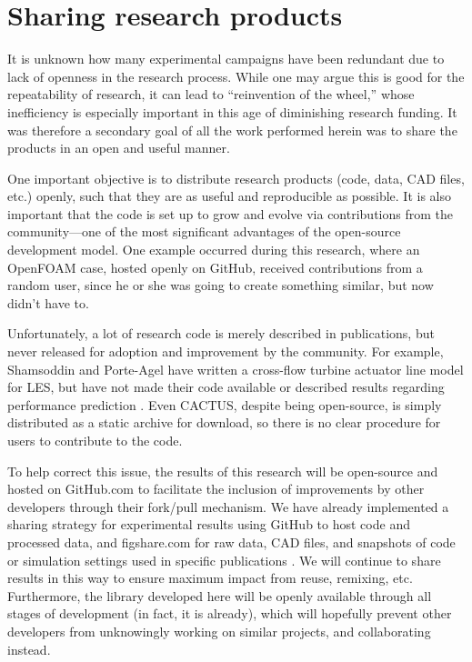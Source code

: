 \chapter{Sharing research products}
\doublespace

It is unknown how many experimental campaigns have been redundant due to lack of
openness in the research process. While one may argue this is good for the
repeatability of research, it can lead to ``reinvention of the wheel,'' whose
inefficiency is especially important in this age of diminishing research
funding. It was therefore a secondary goal of all the work performed herein was
to share the products in an open and useful manner.

One important objective is to distribute research products (code, data, CAD
files, etc.) openly, such that they are as useful and reproducible as possible.
It is also important that the code is set up to grow and evolve via
contributions from the community---one of the most significant advantages of the
open-source development model. One example occurred during this research, where
an OpenFOAM case, hosted openly on GitHub, received contributions from a random
user, since he or she was going to create something similar, but now didn't have
to.

Unfortunately, a lot of research code is merely described in publications, but
never released for adoption and improvement by the community. For example,
Shamsoddin and Porte-Agel have written a cross-flow turbine actuator line model
for LES, but have not made their code available or described results regarding
performance prediction \cite{Shamsoddin2014}. Even CACTUS, despite being
open-source, is simply distributed as a static archive for download, so there is
no clear procedure for users to contribute to the code.

To help correct this issue, the results of this research will be open-source and
hosted on GitHub.com to facilitate the inclusion of improvements by other
developers through their fork/pull mechanism. We have already implemented a
sharing strategy for experimental results using GitHub to host code and
processed data, and figshare.com for raw data, CAD files, and snapshots of code
or simulation settings used in specific publications
\cite{Bachant2014-RVAT-baseline, Bachant2014-RVAT-CAD,
Bachant2014-OF-AS-case-files, Bachant2015-RVAT-Re-dep-data}. We will continue to
share results in this way to ensure maximum impact from reuse, remixing, etc.
Furthermore, the library developed here will be openly available through all
stages of development (in fact, it is already), which will hopefully prevent
other developers from unknowingly working on similar projects, and collaborating
instead.
